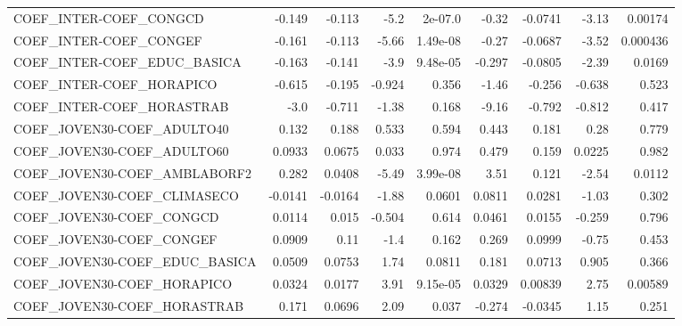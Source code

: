 \begin{tabular}{lrrrrrrrr}
COEF\_INTER-COEF\_CONGCD                &      -0.149 &       -0.113 &     -5.2 &  2e-07.0 &      -0.32 &     -0.0741 &        -3.13 &       0.00174 \\
COEF\_INTER-COEF\_CONGEF                &      -0.161 &       -0.113 &    -5.66 & 1.49e-08 &      -0.27 &     -0.0687 &        -3.52 &      0.000436 \\
COEF\_INTER-COEF\_EDUC\_BASICA           &      -0.163 &       -0.141 &     -3.9 & 9.48e-05 &     -0.297 &     -0.0805 &        -2.39 &        0.0169 \\
COEF\_INTER-COEF\_HORAPICO              &      -0.615 &       -0.195 &   -0.924 &    0.356 &      -1.46 &      -0.256 &       -0.638 &         0.523 \\
COEF\_INTER-COEF\_HORASTRAB             &        -3.0 &       -0.711 &    -1.38 &    0.168 &      -9.16 &      -0.792 &       -0.812 &         0.417 \\
COEF\_JOVEN30-COEF\_ADULTO40            &       0.132 &        0.188 &    0.533 &    0.594 &      0.443 &       0.181 &         0.28 &         0.779 \\
COEF\_JOVEN30-COEF\_ADULTO60            &      0.0933 &       0.0675 &    0.033 &    0.974 &      0.479 &       0.159 &       0.0225 &         0.982 \\
COEF\_JOVEN30-COEF\_AMBLABORF2          &       0.282 &       0.0408 &    -5.49 & 3.99e-08 &       3.51 &       0.121 &        -2.54 &        0.0112 \\
COEF\_JOVEN30-COEF\_CLIMASECO           &     -0.0141 &      -0.0164 &    -1.88 &   0.0601 &     0.0811 &      0.0281 &        -1.03 &         0.302 \\
COEF\_JOVEN30-COEF\_CONGCD              &      0.0114 &        0.015 &   -0.504 &    0.614 &     0.0461 &      0.0155 &       -0.259 &         0.796 \\
COEF\_JOVEN30-COEF\_CONGEF              &      0.0909 &         0.11 &     -1.4 &    0.162 &      0.269 &      0.0999 &        -0.75 &         0.453 \\
COEF\_JOVEN30-COEF\_EDUC\_BASICA         &      0.0509 &       0.0753 &     1.74 &   0.0811 &      0.181 &      0.0713 &        0.905 &         0.366 \\
COEF\_JOVEN30-COEF\_HORAPICO            &      0.0324 &       0.0177 &     3.91 & 9.15e-05 &     0.0329 &     0.00839 &         2.75 &       0.00589 \\
COEF\_JOVEN30-COEF\_HORASTRAB           &       0.171 &       0.0696 &     2.09 &    0.037 &     -0.274 &     -0.0345 &         1.15 &         0.251 \\

\end{tabular}
